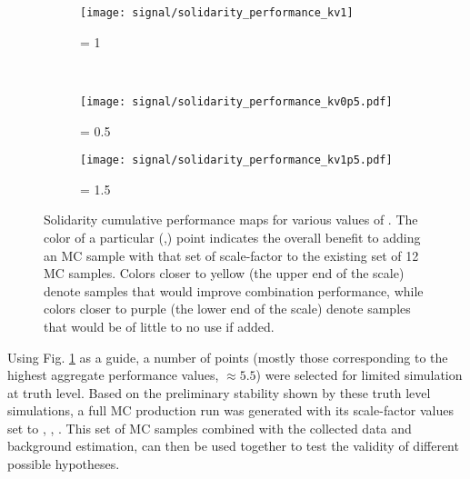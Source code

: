     \begin{figure}[tbh]
        \begin{subfigure}{0.5\textwidth}
            \texttt{[image: signal/solidarity\_performance\_kv1]}
            \captionsetup{justification=centering} \caption{\kv = 1}
        \end{subfigure}\\
        \begin{subfigure}{0.5\textwidth}
            \texttt{[image: signal/solidarity\_performance\_kv0p5.pdf]}
            \captionsetup{justification=centering} \caption{\kv = 0.5}
        \end{subfigure}
        \begin{subfigure}{0.5\textwidth}
            \texttt{[image: signal/solidarity\_performance\_kv1p5.pdf]}
            \captionsetup{justification=centering} \caption{\kv = 1.5}
        \end{subfigure}
        \caption{
            Solidarity cumulative performance maps for various values of \kv.
            The color of a particular (\kvv,\kl) point indicates the overall
                benefit to adding an MC sample with that set of scale-factor
                to the existing set of 12 MC samples.
            Colors closer to yellow (the upper end of the scale) denote samples that would improve combination performance,
                while colors closer to purple (the lower end of the scale) denote samples that would be of little to no use if added.
        }
        \label{fig:solidarity_performance_map}
    \end{figure}
    \FloatBarrier

    Using Fig. \ref{fig:solidarity_performance_map} as a guide,
        a number of points (mostly those corresponding to the highest aggregate performance values, $\approx 5.5$)
        were selected for limited simulation at truth level.
    Based on the preliminary stability shown by these truth level simulations,
        a full MC production run was generated with its scale-factor values set to , , .
    This set of MC samples combined with the collected data and background estimation,
        can then be used together to test the validity of different possible hypotheses.


%
